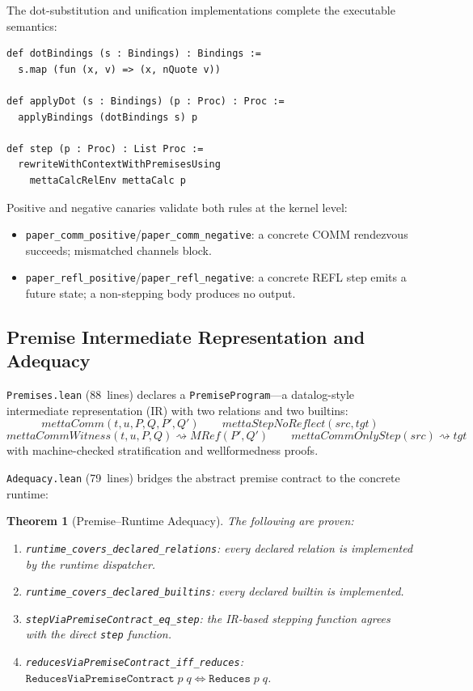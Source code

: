 \documentclass[11pt]{article}
\newtheorem{theorem}{Theorem}[section]
\theoremstyle{definition}
\theoremstyle{remark}
\begin{document}
\noindent
The dot-substitution and unification implementations complete the
executable semantics:

\begin{lstlisting}[caption={Dot-substitution and step function (from \texttt{Reduction.lean})}]
def dotBindings (s : Bindings) : Bindings :=
  s.map (fun (x, v) => (x, nQuote v))

def applyDot (s : Bindings) (p : Proc) : Proc :=
  applyBindings (dotBindings s) p

def step (p : Proc) : List Proc :=
  rewriteWithContextWithPremisesUsing
    mettaCalcRelEnv mettaCalc p
\end{lstlisting}

\noindent
Positive and negative canaries validate both rules at the kernel level:
\begin{itemize}
\item \texttt{paper\_comm\_positive}/\texttt{paper\_comm\_negative}:
  a concrete COMM rendezvous succeeds; mismatched channels block.
\item \texttt{paper\_refl\_positive}/\texttt{paper\_refl\_negative}:
  a concrete REFL step emits a future state; a non-stepping body
  produces no output.
\end{itemize}

\subsection{Premise Intermediate Representation and Adequacy}

\texttt{Premises.lean} (88~lines) declares a \texttt{PremiseProgram}---a
datalog-style intermediate representation (IR) with two relations and
two builtins:
\[
  \mathit{mettaComm}(t, u, P, Q, P', Q') \qquad
  \mathit{mettaStepNoReflect}(\mathit{src}, \mathit{tgt})
\]
\[
  \mathit{mettaCommWitness}(t, u, P, Q) \rightsquigarrow \mathit{MRef}(P', Q')
  \qquad
  \mathit{mettaCommOnlyStep}(\mathit{src}) \rightsquigarrow \mathit{tgt}
\]
with machine-checked stratification and wellformedness proofs.

\texttt{Adequacy.lean} (79~lines) bridges the abstract premise contract
to the concrete runtime:

\begin{theorem}[Premise--Runtime Adequacy]
\label{thm:metta-adequacy}
The following are proven:
\begin{enumerate}[nosep]
\item \texttt{runtime\_covers\_declared\_relations}: every declared
  relation is implemented by the runtime dispatcher.
\item \texttt{runtime\_covers\_declared\_builtins}: every declared
  builtin is implemented.
\item \texttt{stepViaPremiseContract\_eq\_step}: the IR-based
  stepping function agrees with the direct \texttt{step} function.
\item \texttt{reducesViaPremiseContract\_iff\_reduces}:
  $\texttt{ReducesViaPremiseContract}\;p\;q \iff \texttt{Reduces}\;p\;q$.
\end{enumerate}
\end{theorem}
\end{document}
